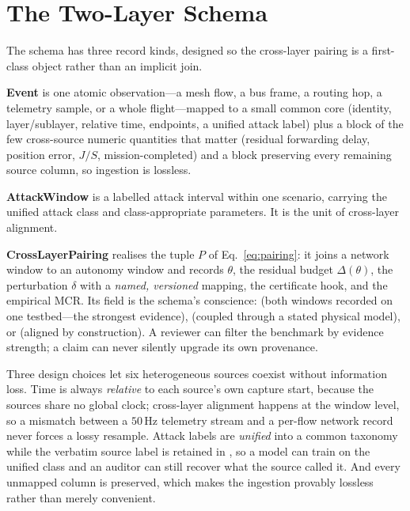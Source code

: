 \section{The Two-Layer Schema}
\label{sec:schema}
The schema has three record kinds, designed so the cross-layer pairing is a
first-class object rather than an implicit join.

\textbf{Event} is one atomic observation---a mesh flow, a bus frame, a routing
hop, a telemetry sample, or a whole flight---mapped to a small common core
(identity, layer/sublayer, relative time, endpoints, a unified attack label)
plus a  block of the few cross-source numeric quantities that
matter (residual forwarding delay, position error, $J/S$, mission-completed) and
a  block preserving every remaining source column, so ingestion is
lossless.

\textbf{AttackWindow} is a labelled attack interval within one scenario,
carrying the unified attack class and class-appropriate 
parameters. It is the unit of cross-layer alignment.

\textbf{CrossLayerPairing} realises the tuple $P$ of Eq.~\eqref{eq:pairing}: it
joins a network window to an autonomy window and records $\theta$, the residual
budget $\Delta(\theta)$, the perturbation $\delta$ with a \emph{named,
versioned} mapping, the certificate hook, and the empirical MCR. Its
 field is the schema's conscience:
 (both windows recorded on one testbed---the
strongest evidence),  (coupled through a stated physical
model), or  (aligned by construction). A reviewer can
filter the benchmark by evidence strength; a claim can never silently upgrade
its own provenance.

Three design choices let six heterogeneous sources coexist without information
loss. Time is always \emph{relative} to each source's own capture start, because
the sources share no global clock; cross-layer alignment happens at the window
level, so a mismatch between a $50$\,Hz telemetry stream and a per-flow network
record never forces a lossy resample. Attack labels are \emph{unified} into a
common taxonomy while the verbatim source label is retained in
, so a model can train on the unified class and an auditor
can still recover what the source called it. And every unmapped column is
preserved, which makes the ingestion provably lossless rather than merely
convenient.

